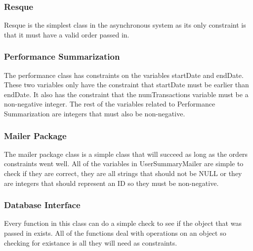 \subsubsection{Resque}
Resque is the simplest class in the asynchronous system as its only constraint is that it must have a valid order passed in.
\subsubsection{Performance Summarization}
The performance class has constraints on the variables startDate and endDate. These two variables only have the constraint that startDate must be earlier than endDate. It also has the constraint that the numTransactions variable must be a non-negative integer.
The rest of the variables related to Performance Summarization are integers that must also be non-negative.
\subsubsection{Mailer Package}
The mailer package class is a simple class that will succeed as long as the orders constraints went well. All of the variables in UserSummaryMailer are simple to check if they are correct, they are all strings that should not be NULL or they are integers that should represent an ID so they must be non-negative.
\subsubsection{Database Interface}
Every function in this class can do a simple check to see if the object that was passed in exists. All of the functions deal with operations on an object so checking for existance is all they will need as constraints.
